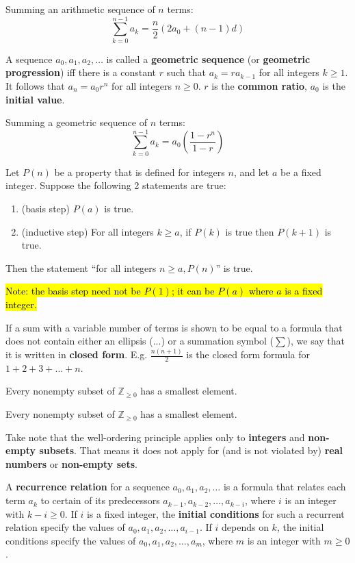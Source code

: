 \documentclass{article}
\begin{document}
\begin{description}
    \item \qquad Summing an arithmetic sequence of $n$ terms: \[\sum_{k=0}^{n-1}a_{k}=\frac{n}{2}(2a_{0}+(n-1)d)\]
    \item[Geometric Sequence] A sequence $a_{0}, a_{1},a_{2},\dots$ is called a \textbf{geometric sequence} (or \textbf{geometric progression}) iff there is a constant $r$ such that $a_{k}=ra_{k-1}$ for all integers $k\geq 1$. It follows that $a_{n}=a_{0}r^{n}$ for all integers $n\geq 0$. $r$ is the \textbf{common ratio}, $a_{0}$ is the \textbf{initial value}.
    \item \qquad Summing a geometric sequence of $n$ terms: \[ \sum_{k=0}^{n-1}a_{k}=a_{0}(\frac{1-r^{n}}{1-r}) \] 
    \item[Principal of Mathematical Induction (PMI)] Let $P(n)$ be a property that is defined for integers $n$, and let $a$ be a fixed integer. Suppose the following 2 statements are true:
    \begin{enumerate}
    	\item (basis step) $P(a)$ is true. 
		\item (inductive step) For all integers $k\geq a$, if $P(k)$ is true then $P(k+1)$ is true.     \end{enumerate}
    \item \qquad Then the statement ``for all integers $n\geq a, P(n)$'' is true.
    \item \qquad \hl{Note: the basis step need not be $P(1)$; it can be $P(a)$ where $a$ is a fixed integer.}     
    \item[Closed Form] If a sum with a variable number of terms is shown to be equal to a formula that does not contain either an ellipsis (...) or a summation symbol ($\sum$), we say that it is written in \textbf{closed form}. E.g. $\frac{n(n+1)}{2}$ is the closed form formula for $1+2+3+\dots+n$.
    \item[Well-Ordering Principle for the Integers] Every nonempty subset of $\mathbb{Z}_{\geq 0}$ has a smallest element.
    \item[Well-Ordering Principle for Non-Negative Integers] Every nonempty subset of $\mathbb{Z}_{\geq 0}$ has a smallest element.
    \item \qquad Take note that the well-ordering principle applies only to \textbf{integers} and \textbf{non-empty subsets}. That means it does not apply for (and is not violated by) \textbf{real numbers} or \textbf{non-empty sets}.
    \item[Recurrence Relation]A \textbf{recurrence relation} for a sequence $a_{0}, a_{1},a_{2},\dots$ is a formula that relates each term $a_{k}$ to certain of its predecessors $a_{k-1}, a_{k-2},\dots,a_{k-i}$, where $i$ is an integer with $k-i\geq 0$. If $i$ is a fixed integer, the \textbf{initial conditions} for such a recurrent relation specify the values of $a_{0}, a_{1},a_{2},\dots,a_{i-1}$. If $i$ depends on $k$, the initial conditions specify the values of $a_{0}, a_{1},a_{2},\dots,a_{m}$, where $m$ is an integer with $m\geq 0$.

\end{description}
\end{document}
